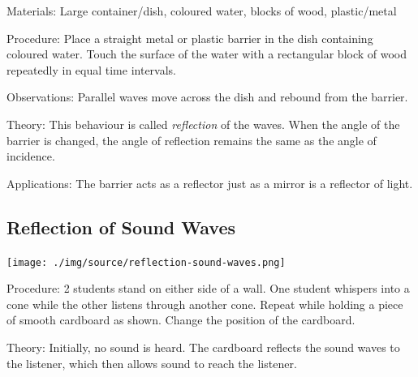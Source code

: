 \begin{multicols}{2}
\begin{description*}
\item[Materials:]{Large container/dish, coloured water, blocks of wood, plastic/metal}
\item[Procedure:]{Place a straight metal or plastic barrier in the dish containing coloured water. Touch the surface of the water with a rectangular block of wood repeatedly in equal time intervals.}
\item[Observations:]{Parallel waves move across the dish and rebound from the barrier.}
\item[Theory:]{This behaviour is called \emph{reflection} of the waves. When the angle of the barrier is changed, the angle of reflection remains the same as the angle of incidence.}
\item[Applications:]{The barrier acts as a reflector just as a mirror is a reflector of light.}
\end{description*}

\subsection{Reflection of Sound Waves}

\begin{center}
\texttt{[image: ./img/source/reflection-sound-waves.png]}
\end{center}

\begin{description*}
\item[Procedure:]{2 students stand on either side of a wall. One student whispers into a cone while the other listens through another cone. Repeat while holding a piece of smooth cardboard as shown. Change the position of the cardboard.}
\item[Theory:]{Initially, no sound is heard. The cardboard reflects the sound waves to the listener, which then allows sound to reach the listener.}
\end{description*}


\end{multicols}
